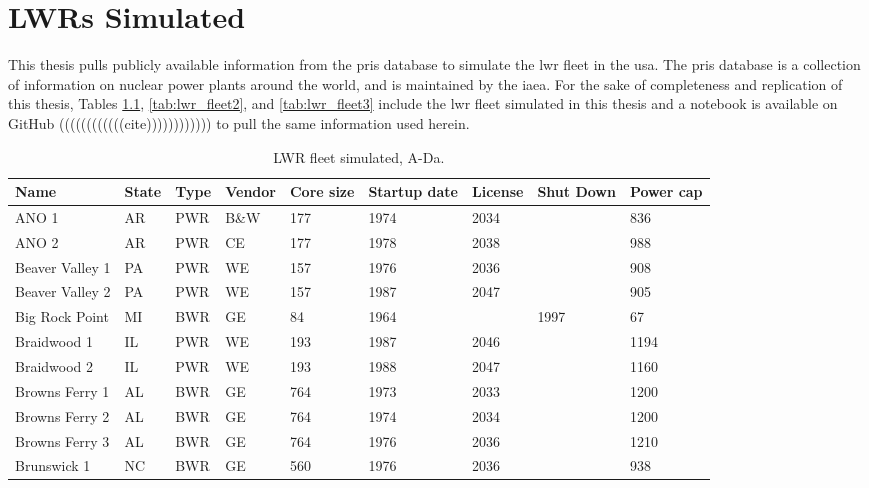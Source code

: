 \chapter{LWRs Simulated}
\label{app:lwrs}

This thesis pulls publicly available information from the \gls{pris} database \cite{IAEA_PRIS} to simulate the \gls{lwr} fleet in the \gls{usa}. The \gls{pris} database is a collection of information on nuclear power plants around the world, and is maintained by the \gls{iaea}. For the sake of completeness and replication of this thesis, Tables \ref{tab:lwr_fleet_1}, \ref{tab:lwr_fleet2}, and \ref{tab:lwr_fleet3} include the \gls{lwr} fleet simulated in this thesis and a notebook is available on GitHub ((((((((((((cite)))))))))))) to pull the same information used herein.


\begin{table}[H]
    \centering
    \caption{LWR fleet simulated, A-Da.}
    \label{tab:lwr_fleet_1}
    \begin{tabular}{l l l l l l l l l}
    \hline
    \textbf{Name} & \textbf{State} & \textbf{Type} & \textbf{Vendor} & \textbf{Core size} & \textbf{Startup date} & \textbf{License} & \textbf{Shut Down} & \textbf{Power cap} \\
    \hline
    ANO 1                 &AR & PWR & B\&W & 177 & 1974 & 2034 &      & 836 \\
    ANO 2                 &AR & PWR & CE   & 177 & 1978 & 2038 &      & 988 \\
    Beaver Valley 1       &PA & PWR & WE   & 157 & 1976 & 2036 &      & 908 \\
    Beaver Valley 2       &PA & PWR & WE   & 157 & 1987 & 2047 &      & 905 \\
    Big Rock Point        &MI & BWR & GE   & 84  & 1964 &      & 1997 & 67  \\
    Braidwood 1           &IL & PWR & WE   & 193 & 1987 & 2046 &      & 1194\\
    Braidwood 2           &IL & PWR & WE   & 193 & 1988 & 2047 &      & 1160\\
    Browns Ferry 1        &AL & BWR & GE   & 764 & 1973 & 2033 &      & 1200\\
    Browns Ferry 2        &AL & BWR & GE   & 764 & 1974 & 2034 &      & 1200\\
    Browns Ferry 3        &AL & BWR & GE   & 764 & 1976 & 2036 &      & 1210\\
    Brunswick 1           &NC & BWR & GE   & 560 & 1976 & 2036 &      & 938 \\

\end{tabular}
\end{table}

